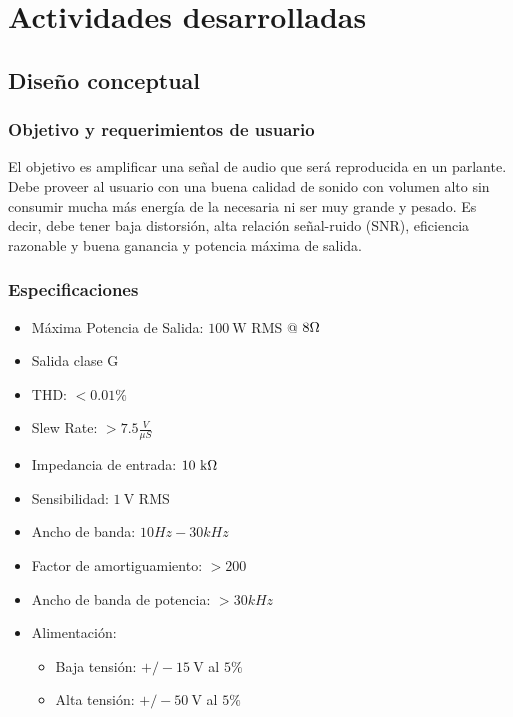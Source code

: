 \documentclass[a4paper,12pt,twoside]{article}
\newcommand{\volt}{\ensuremath{~\mathrm{V}}}
\newcommand{\kohm}{\ensuremath{~\mathrm{k}\ohm}}
\newcommand{\watt}{\ensuremath{~\mathrm{W}}}
\begin{document}


\newpage
\vfill
\tableofcontents
\vfill


\newpage

\section{Actividades desarrolladas}

\subsection{Diseño conceptual}

\subsubsection{Objetivo y requerimientos de usuario}

El objetivo es amplificar una señal de audio que será reproducida en un parlante.  Debe proveer al usuario con una buena calidad de sonido con volumen alto sin consumir mucha más energía de la necesaria ni ser muy grande y pesado. Es decir, debe tener baja distorsión, alta relación señal-ruido (SNR), eficiencia razonable y buena ganancia y potencia máxima de salida.



\subsubsection{Especificaciones}

\bigskip

\begin{itemize}
	\item Máxima Potencia de Salida:  $100\watt$ RMS @ $8\ohm$
	\item Salida clase G
	\item THD: $< 0.01 \%$  %
	\item Slew Rate: $>7.5\frac{V}{\mu S}$
	\item Impedancia de entrada: $10\kohm$
	\item Sensibilidad: $1\volt$ RMS
	\item Ancho de banda: $10 Hz-30kHz$
	\item Factor de amortiguamiento: $>200$
	\item Ancho de banda de potencia: $>30kHz$
	\item Alimentación: 
	\begin{itemize}
		\item Baja tensión: $ +/-15\volt$ al $5\%$
		\item Alta tensión: $ +/-50\volt$ al $5\%$
	\end{itemize}
\end{itemize}
\end{document}
